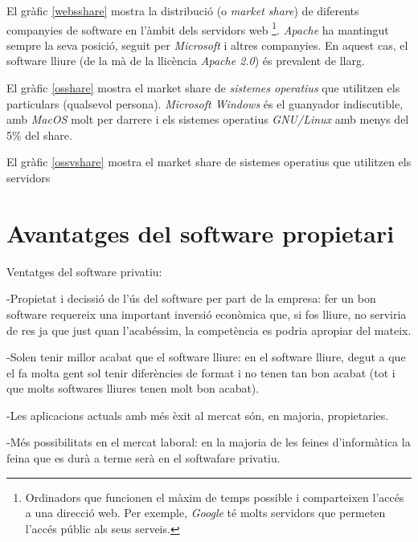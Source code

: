 	El gràfic \ref{websshare} mostra la distribució (o \emph{market share}) de diferents companyies de software
	en l'àmbit dels servidors web
	\footnote{Ordinadors que funcionen el màxim de temps possible i comparteixen l'accés a una direcció web.
	Per exemple, \emph{Google} té molts servidors que permeten l'accés públic als seus serveis.}.
	\emph{Apache}\cite{apache} ha mantingut sempre la seva posició,
	seguit per \emph{Microsoft} i altres companyies. En aquest cas, el software lliure (de la mà de la
	llicència \emph{Apache 2.0}\cite{apachelicense}) és prevalent de llarg.

	El gràfic \ref{osshare} mostra el market share de \emph{sistemes operatius} que utilitzen els particulars
	(qualsevol persona). \emph{Microsoft Windows} és el guanyador indiscutible, amb \emph{MacOS} molt per darrere
	i els sistemes operatius \emph{GNU/Linux} amb menys del 5\% del share.

	El gràfic \ref{ossvshare} mostra el market share de sistemes operatius que utilitzen els servidors


\section{Avantatges del software propietari}

Ventatges del software privatiu: 

-Propietat i decissió de l'ús del software per part de la empresa: fer un bon software 
requereix una important inversió econòmica que, si fos lliure, no serviria de res ja 
que just quan l'acabéssim, la competència es podria apropiar del mateix.

-Solen tenir millor acabat que el software lliure: en el software lliure, degut a que
 el fa molta gent sol tenir diferències de format i no tenen tan bon acabat (tot i que
 molts softwares lliures tenen molt bon acabat).

-Les aplicacions actuals amb més èxit al mercat són, en majoria, propietaries.

-Més possibilitats en el mercat laboral: en la majoria de les feines d'informàtica la
feina que es durà a terme serà en el softwafare privatiu.
\cite{gentegeek}








